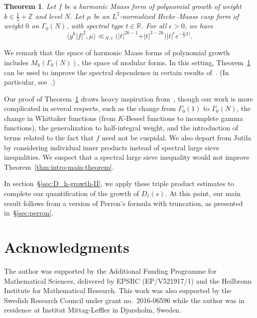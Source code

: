 \documentclass[11pt,reqno]{amsart}
\theoremstyle{plain}
\newtheorem{theorem}{Theorem}[section]
\theoremstyle{definition}
\numberwithin{equation}{section}
\begin{document}
\begin{theorem} \label{thm:intro-inner-product-bound}
Let $f$ be a harmonic Maass form of polynomial growth of weight $k \in \frac{1}{2} + \mathbb{Z}$ and level $N$. Let $\mu$ be an $L^2$-normalized Hecke--Maass cusp form of weight $0$ on $\Gamma_0(N)$, with spectral type $t \in \mathbb{R}$. For all $\epsilon > 0$, we have
\[
	\langle y^k \vert f \vert^2, \mu \rangle 
		\ll_{N,\epsilon}
		\big( \vert t \vert^{2k-1} + \vert t \vert^{3-2k} \big) \vert t \vert^\epsilon
		e^{-\frac{\pi}{2} \vert t \vert}.
\]
\end{theorem}
We remark that the space of harmonic Maass forms of polynomial growth includes $M_k(\Gamma_0(N))$, the space of modular forms. In this setting, Theorem~\ref{thm:intro-inner-product-bound} can be used to improve the spectral dependence in certain results of~\cite{Kiral15}. (In particular, see~\cite[Proposition 14]{Kiral15}.)

Our proof of Theorem~\ref{thm:intro-inner-product-bound} draws heavy inspiration from~\cite{Jutila96,Jutila97}, though our work is more complicated in several respects, such as the change from $\Gamma_0(1)$ to $\Gamma_0(N)$, the change in Whittaker functions (from $K$-Bessel functions to incomplete gamma functions), the generalization to half-integral weight, and the introduction of terms related to the fact that $f$ need not be cuspidal.
We also depart from Jutila by considering individual inner products instead of spectral large sieve inequalities. We suspect that a spectral large sieve inequality would not improve Theorem~\ref{thm:intro-main-theorem}.

In section~\S{\ref{sec:D_h-growth-II}}, we apply these triple product estimates to complete our quantification of the growth of $D_\ell(s)$. At this point, our main result follows from a version of Perron's formula with truncation, as presented in~\S{\ref{sec:perron}}.

\section*{Acknowledgments}

The author was supported by the Additional Funding Programme for Mathematical Sciences, delivered by EPSRC (EP/V521917/1) and the Heilbronn Institute for Mathematical Research. This work was also supported by the Swedish Research Council under grant no.\ 2016-06596 while the author was in residence at Institut Mittag-Leffler in Djursholm, Sweden.
\end{document}
